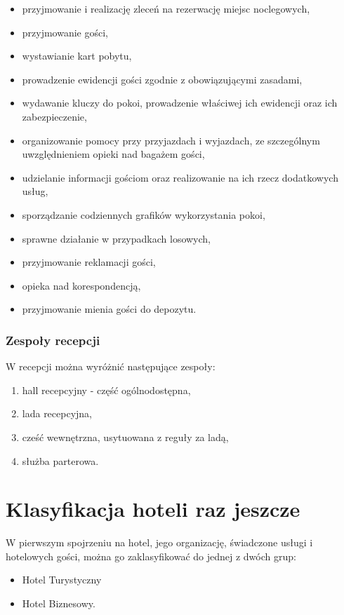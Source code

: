 \documentclass[a4paper,onecolumn,oneside,11pt,wide,floatssmall]{mwrep}
\theoremstyle{definition}
\theoremstyle{plain}%
\theoremstyle{remark}
\begin{document}
\begin{itemize}
  \item przyjmowanie i realizację zleceń na rezerwację miejsc noclegowych,
  \item przyjmowanie gości,
  \item wystawianie kart pobytu,
  \item prowadzenie ewidencji gości zgodnie z obowiązującymi zasadami,
  \item wydawanie kluczy do pokoi, prowadzenie właściwej ich ewidencji oraz 
  ich zabezpieczenie,
  \item organizowanie pomocy przy przyjazdach i wyjazdach, ze szczególnym 
  uwzględnieniem opieki nad bagażem gości,
  \item udzielanie informacji gościom oraz realizowanie na ich rzecz 
  dodatkowych usług,
  \item sporządzanie codziennych grafików wykorzystania pokoi,
  \item sprawne działanie w przypadkach losowych,
  \item przyjmowanie reklamacji gości,
  \item opieka nad korespondencją,
  \item przyjmowanie mienia gości do depozytu.
\end{itemize}

\subsubsection{Zespoły recepcji}
W recepcji można wyróżnić następujące zespoły\cite{hotel2:part1}:
\begin{enumerate}
  \item hall recepcyjny - część ogólnodostępna,
  \item lada recepcyjna,
  \item cześć wewnętrzna, usytuowana z reguły za ladą,
  \item służba parterowa.
\end{enumerate}

\section{Klasyfikacja hoteli raz jeszcze}
W pierwszym spojrzeniu na hotel, jego organizację, świadczone usługi i 
hotelowych gości, można go zaklasyfikować do jednej z dwóch grup:

\begin{itemize}
  \item Hotel Turystyczny
  \item Hotel Biznesowy.
\end{itemize}
\end{document}
